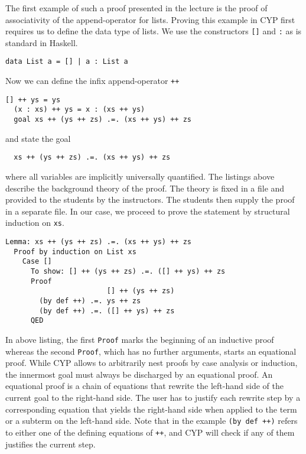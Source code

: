 The first example of such a proof presented in the lecture is the proof of associativity of the append-operator for lists.
Proving this example in CYP first requires us
to define the data type of lists.
We use
the constructors \lstinline[style=cyp]![]! and \lstinline[style=cyp]!:!
as is standard in Haskell.
\begin{lstlisting}[style=cyp]
  data List a = [] | a : List a
\end{lstlisting}
Now we can define the infix append-operator \lstinline[style=cyp]!++!
\begin{lstlisting}[style=cyp]
  [] ++ ys = ys
  (x : xs) ++ ys = x : (xs ++ ys)
  goal xs ++ (ys ++ zs) .=. (xs ++ ys) ++ zs
\end{lstlisting}
and state the goal
\begin{lstlisting}
  xs ++ (ys ++ zs) .=. (xs ++ ys) ++ zs
\end{lstlisting}
where all variables are implicitly universally quantified.
The listings above describe the background theory of the proof.
The theory is fixed in a file and provided
to the students by the instructors.
The students then supply the proof in a separate file.
In our case, we proceed to prove the statement by structural induction on \lstinline[style=cyp]!xs!.
\begin{lstlisting}[style=cyp]
  Lemma: xs ++ (ys ++ zs) .=. (xs ++ ys) ++ zs
  Proof by induction on List xs
    Case []
      To show: [] ++ (ys ++ zs) .=. ([] ++ ys) ++ zs
      Proof
                        [] ++ (ys ++ zs)
        (by def ++) .=. ys ++ zs
        (by def ++) .=. ([] ++ ys) ++ zs
      QED
\end{lstlisting}
In above listing, the first \lstinline[style=cyp]!Proof! marks the beginning of an inductive proof whereas the second \lstinline[style=cyp]!Proof!, which has no further arguments, starts an equational proof.
While CYP allows to arbitrarily nest proofs
by case analysis or induction,
the innermost goal must always be discharged by an equational proof.
An equational proof is a chain of equations that rewrite the left-hand side of the current goal to the right-hand side.
The user has to justify each rewrite step by a corresponding equation that yields the right-hand side
when applied to the term or a subterm on the left-hand side.
Note that in the example \lstinline[style=cyp]!(by def ++)! refers to either one of the defining equations of \lstinline[style=cyp]!++!,
and CYP will check if any of them justifies the current step.

